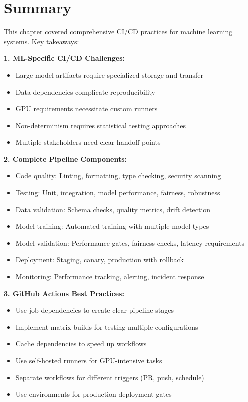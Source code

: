 \section{Summary}

This chapter covered comprehensive CI/CD practices for machine learning systems. Key takeaways:

\textbf{1. ML-Specific CI/CD Challenges:}
\begin{itemize}
    \item Large model artifacts require specialized storage and transfer
    \item Data dependencies complicate reproducibility
    \item GPU requirements necessitate custom runners
    \item Non-determinism requires statistical testing approaches
    \item Multiple stakeholders need clear handoff points
\end{itemize}

\textbf{2. Complete Pipeline Components:}
\begin{itemize}
    \item Code quality: Linting, formatting, type checking, security scanning
    \item Testing: Unit, integration, model performance, fairness, robustness
    \item Data validation: Schema checks, quality metrics, drift detection
    \item Model training: Automated training with multiple model types
    \item Model validation: Performance gates, fairness checks, latency requirements
    \item Deployment: Staging, canary, production with rollback
    \item Monitoring: Performance tracking, alerting, incident response
\end{itemize}

\textbf{3. GitHub Actions Best Practices:}
\begin{itemize}
    \item Use job dependencies to create clear pipeline stages
    \item Implement matrix builds for testing multiple configurations
    \item Cache dependencies to speed up workflows
    \item Use self-hosted runners for GPU-intensive tasks
    \item Separate workflows for different triggers (PR, push, schedule)
    \item Use environments for production deployment gates
\end{itemize}

